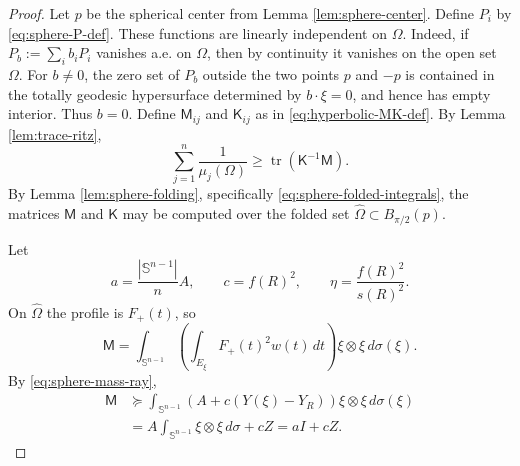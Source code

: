\documentclass[10pt,a4paper]{amsart}
\DeclareMathOperator{\tr}{tr}
\newcommand{\Sn}{\mathbb S}
\newcommand{\Id}{I}
\newcommand{\mcM}{\mathsf M}
\newcommand{\mcK}{\mathsf K}
\begin{document}
\begin{proof}
Let $p$ be the spherical center from Lemma \ref{lem:sphere-center}.  Define $P_i$ by \eqref{eq:sphere-P-def}.  These functions are linearly independent on $\Omega$.  Indeed, if $P_b:=\sum_i b_iP_i$ vanishes a.e. on $\Omega$, then by continuity it vanishes on the open set $\Omega$.  For $b\ne0$, the zero set of $P_b$ outside the two points $p$ and $-p$ is contained in the totally geodesic hypersurface determined by $b\cdot\xi=0$, and hence has empty interior.  Thus $b=0$.  Define $\mcM_{ij}$ and $\mcK_{ij}$ as in \eqref{eq:hyperbolic-MK-def}. By Lemma \ref{lem:trace-ritz},
\begin{equation}\label{eq:sphere-ritz-main}
        \sum_{j=1}^n\frac1{\mu_j(\Omega)}
        \ge \tr(\mcK^{-1}\mcM).
\end{equation}
By Lemma \ref{lem:sphere-folding}, specifically \eqref{eq:sphere-folded-integrals}, the matrices $\mcM$ and $\mcK$ may be computed over the folded set $\widehat\Omega\subset B_{\pi/2}(p)$.

Let
\begin{equation}\label{eq:sphere-aceta-def}
        a=\frac{|\Sn^{n-1}|}{n}A,
        \qquad
        c=f(R)^2,
        \qquad
        \eta=\frac{f(R)^2}{s(R)^2}.
\end{equation}
On $\widehat\Omega$ the profile is $F_+(t)$, so
$$
        \mcM
        =\int_{\Sn^{n-1}}
        \left(\int_{E_\xi}F_+(t)^2w(t)\,dt\right)
        \xi\otimes\xi\,d\sigma(\xi).
$$
By \eqref{eq:sphere-mass-ray},
\begin{align*}
        \mcM
        &\succeq
        \int_{\Sn^{n-1}}
        \left(A+c(Y(\xi)-Y_R)\right)
        \xi\otimes\xi\,d\sigma(\xi)\\
        &=A\int_{\Sn^{n-1}}\xi\otimes\xi\,d\sigma+cZ
        =a\Id+cZ.
\end{align*}


\end{proof}
\end{document}
